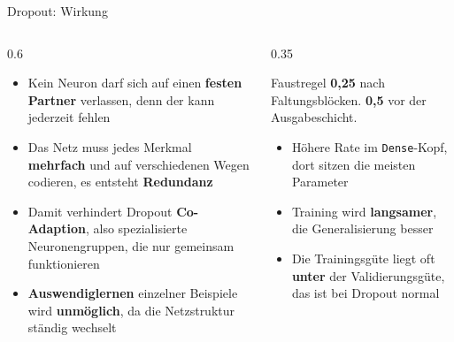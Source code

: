 \begin{frame}{Dropout: Wirkung}
    \footnotesize
\begin{columns}
\begin{column}{0.6\linewidth}
\begin{itemize}
  \item Kein Neuron darf sich auf einen \textbf{festen Partner} verlassen, denn der kann jederzeit fehlen
  \item Das Netz muss jedes Merkmal \textbf{mehrfach} und auf verschiedenen Wegen codieren, es entsteht \textbf{Redundanz}
  \item Damit verhindert Dropout \textbf{Co-Adaption}, also spezialisierte Neuronengruppen, die nur gemeinsam funktionieren
  \item \textbf{Auswendiglernen} einzelner Beispiele wird \textbf{unmöglich}, da die Netzstruktur ständig wechselt
\end{itemize}
\end{column}
\begin{column}{0.35\linewidth}
\begin{block}{\footnotesize Faustregel}
\textbf{0,25} nach Faltungsblöcken. \textbf{0,5} vor der Ausgabeschicht.
\end{block}
\begin{itemize}
  \item Höhere Rate im \texttt{Dense}-Kopf, dort sitzen die meisten Parameter
  \item Training wird \textbf{langsamer}, die Generalisierung besser
  \item Die Trainingsgüte liegt oft \textbf{unter} der Validierungsgüte, das ist bei Dropout normal
\end{itemize}
\end{column}
\end{columns}
\end{frame}


